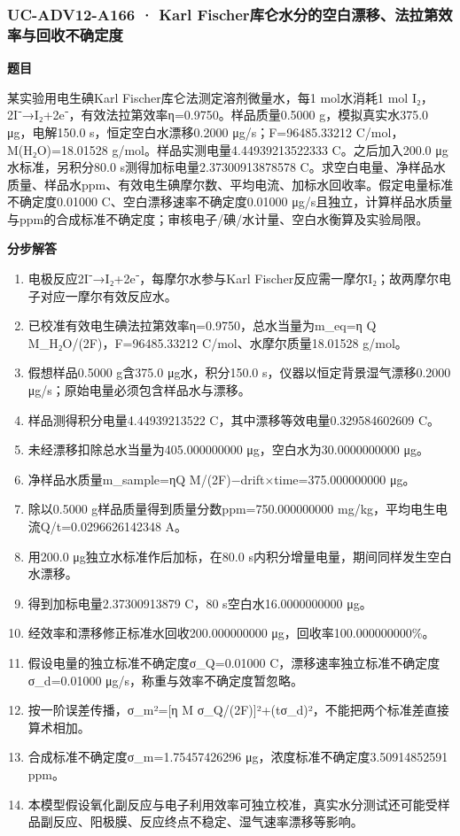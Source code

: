 \documentclass[UTF8,11pt,a4paper]{ctexart}
\begin{document}
\subsubsection*{UC-ADV12-A166 · Karl Fischer库仑水分的空白漂移、法拉第效率与回收不确定度}
\noindent\textbf{题目}\par
某实验用电生碘Karl Fischer库仑法测定溶剂微量水，每1 mol水消耗1 mol I₂，2I⁻→I₂+2e⁻，有效法拉第效率η=0.9750。样品质量0.5000 g，模拟真实水375.0 μg，电解150.0 s，恒定空白水漂移0.2000 μg/s；F=96485.33212 C/mol，M(H₂O)=18.01528 g/mol。样品实测电量4.44939213522333 C。之后加入200.0 μg水标准，另积分80.0 s测得加标电量2.37300913878578 C。求空白电量、净样品水质量、样品水ppm、有效电生碘摩尔数、平均电流、加标水回收率。假定电量标准不确定度0.01000 C、空白漂移速率不确定度0.01000 μg/s且独立，计算样品水质量与ppm的合成标准不确定度；审核电子/碘/水计量、空白水衡算及实验局限。\par
\medskip\noindent\textbf{分步解答}
\begin{enumerate}
\item 电极反应2I⁻→I₂+2e⁻，每摩尔水参与Karl Fischer反应需一摩尔I₂；故两摩尔电子对应一摩尔有效反应水。
\item 已校准有效电生碘法拉第效率η=0.9750，总水当量为m\_eq=η Q M\_H₂O/(2F)，F=96485.33212 C/mol、水摩尔质量18.01528 g/mol。
\item 假想样品0.5000 g含375.0 μg水，积分150.0 s，仪器以恒定背景湿气漂移0.2000 μg/s；原始电量必须包含样品水与漂移。
\item 样品测得积分电量4.44939213522 C，其中漂移等效电量0.329584602609 C。
\item 未经漂移扣除总水当量为405.000000000 μg，空白水为30.0000000000 μg。
\item 净样品水质量m\_sample=ηQ M/(2F)−drift×time=375.000000000 μg。
\item 除以0.5000 g样品质量得到质量分数ppm=750.000000000 mg/kg，平均电生电流Q/t=0.0296626142348 A。
\item 用200.0 μg独立水标准作后加标，在80.0 s内积分增量电量，期间同样发生空白水漂移。
\item 得到加标电量2.37300913879 C，80 s空白水16.0000000000 μg。
\item 经效率和漂移修正标准水回收200.000000000 μg，回收率100.000000000\%。
\item 假设电量的独立标准不确定度σ\_Q=0.01000 C，漂移速率独立标准不确定度σ\_d=0.01000 μg/s，称重与效率不确定度暂忽略。
\item 按一阶误差传播，σ\_m²=[η M σ\_Q/(2F)]²+(tσ\_d)²，不能把两个标准差直接算术相加。
\item 合成标准不确定度σ\_m=1.75457426296 μg，浓度标准不确定度3.50914852591 ppm。
\item 本模型假设氧化副反应与电子利用效率可独立校准，真实水分测试还可能受样品副反应、阳极膜、反应终点不稳定、湿气速率漂移等影响。
\end{enumerate}
\end{document}
